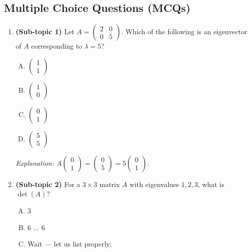 \documentclass[12pt,a4paper]{article}
\begin{document}
\subsection*{Multiple Choice Questions (MCQs)}

\begin{enumerate}

  \item \textbf{(Sub-topic 1)} Let $A = \begin{pmatrix}2&0\\0&5\end{pmatrix}$. Which of the following
        is an eigenvector of $A$ corresponding to $\lambda=5$?
  \begin{enumerate}[(A)]
    \item $\begin{pmatrix}1\\1\end{pmatrix}$
    \item $\begin{pmatrix}1\\0\end{pmatrix}$
    \item \textbf{$\begin{pmatrix}0\\1\end{pmatrix}$}
    \item $\begin{pmatrix}5\\5\end{pmatrix}$
  \end{enumerate}
  \textit{Explanation: $A\begin{pmatrix}0\\1\end{pmatrix}=\begin{pmatrix}0\\5\end{pmatrix}=5\begin{pmatrix}0\\1\end{pmatrix}$.}

  \item \textbf{(Sub-topic 2)} For a $3\times 3$ matrix $A$ with eigenvalues $1, 2, 3$, what is $\det(A)$?
  \begin{enumerate}[(A)]
    \item $3$
    \item $6$ ... \textbf{$6$}
    \item Wait --- let us list properly:
  \end{enumerate}


\end{enumerate}
\end{document}
